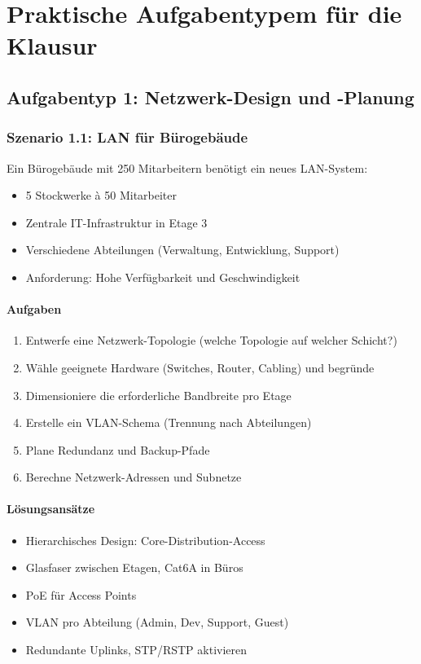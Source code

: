 \documentclass[12pt,a4paper,german]{report}
\begin{document}
\newpage
\part{Praktische Aufgabentypem für die Klausur}

\chapter{Aufgabentyp 1: Netzwerk-Design und -Planung}

\section{Szenario 1.1: LAN für Bürogebäude}

Ein Bürogebäude mit 250 Mitarbeitern benötigt ein neues LAN-System:
\begin{itemize}
    \item 5 Stockwerke à 50 Mitarbeiter
    \item Zentrale IT-Infrastruktur in Etage 3
    \item Verschiedene Abteilungen (Verwaltung, Entwicklung, Support)
    \item Anforderung: Hohe Verfügbarkeit und Geschwindigkeit
\end{itemize}

\subsection{Aufgaben}
\begin{enumerate}
    \item Entwerfe eine Netzwerk-Topologie (welche Topologie auf welcher Schicht?)
    \item Wähle geeignete Hardware (Switches, Router, Cabling) und begründe
    \item Dimensioniere die erforderliche Bandbreite pro Etage
    \item Erstelle ein VLAN-Schema (Trennung nach Abteilungen)
    \item Plane Redundanz und Backup-Pfade
    \item Berechne Netzwerk-Adressen und Subnetze
\end{enumerate}

\subsection{Lösungsansätze}
\begin{itemize}
    \item Hierarchisches Design: Core-Distribution-Access
    \item Glasfaser zwischen Etagen, Cat6A in Büros
    \item PoE für Access Points
    \item VLAN pro Abteilung (Admin, Dev, Support, Guest)
    \item Redundante Uplinks, STP/RSTP aktivieren
\end{itemize}
\end{document}
